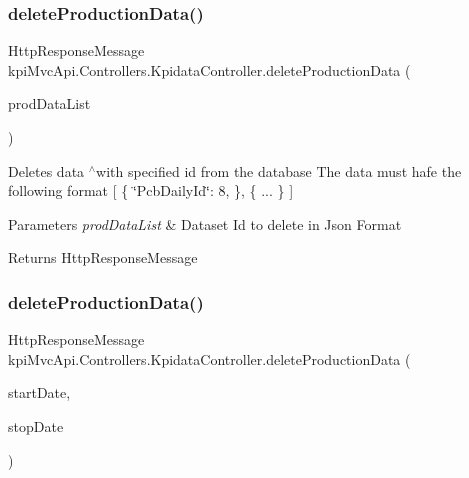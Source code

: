 \subsubsection{\texorpdfstring{delete\+Production\+Data()}{deleteProductionData()}\hspace{0.1cm}{\footnotesize\ttfamily [2/4]}}
{\footnotesize\ttfamily Http\+Response\+Message kpi\+Mvc\+Api.\+Controllers.\+Kpidata\+Controller.\+delete\+Production\+Data (\begin{DoxyParamCaption}\item[{List$<$ \hyperlink{classkpi_mvc_api_1_1_data_transfer_objects_1_1_production_data_dto}{Production\+Data\+Dto} $>$}]{prod\+Data\+List }\end{DoxyParamCaption})\hspace{0.3cm}{\ttfamily [inline]}}



Deletes data $^\wedge$with specified id from the database The data must hafe the following format \mbox{[} \{ \char`\"{}\+Pcb\+Daily\+Id\char`\"{}\+: 8, \}, \{ ... \} \mbox{]} 


\begin{DoxyParams}{Parameters}
{\em prod\+Data\+List} & Dataset Id to delete in Json Format \\
\hline
\end{DoxyParams}
\begin{DoxyReturn}{Returns}
{\ttfamily Http\+Response\+Message} 
\end{DoxyReturn}
\mbox{\label{classkpi_mvc_api_1_1_controllers_1_1_kpidata_controller_a10ba0d225612ba751e0948c601db9a9d}} 
\subsubsection{\texorpdfstring{delete\+Production\+Data()}{deleteProductionData()}\hspace{0.1cm}{\footnotesize\ttfamily [3/4]}}
{\footnotesize\ttfamily Http\+Response\+Message kpi\+Mvc\+Api.\+Controllers.\+Kpidata\+Controller.\+delete\+Production\+Data (\begin{DoxyParamCaption}\item[{string}]{start\+Date,  }\item[{string}]{stop\+Date }\end{DoxyParamCaption})\hspace{0.3cm}{\ttfamily [inline]}}



